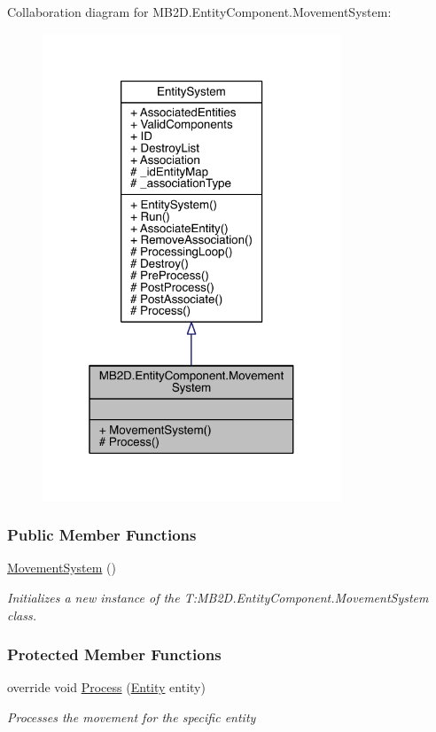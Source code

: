 Collaboration diagram for M\+B2\+D.\+Entity\+Component.\+Movement\+System\+:
\nopagebreak
\begin{figure}[H]
\begin{center}
\leavevmode
\includegraphics[width=253pt]{class_m_b2_d_1_1_entity_component_1_1_movement_system__coll__graph}
\end{center}
\end{figure}
\subsubsection*{Public Member Functions}
\begin{DoxyCompactItemize}
\item 
\hyperlink{class_m_b2_d_1_1_entity_component_1_1_movement_system_a64ad47c34d25ff6a9df2d2d841fc7cfb}{Movement\+System} ()
\begin{DoxyCompactList}\small\item\em Initializes a new instance of the T\+:\+M\+B2\+D.\+Entity\+Component.\+Movement\+System class. \end{DoxyCompactList}\end{DoxyCompactItemize}
\subsubsection*{Protected Member Functions}
\begin{DoxyCompactItemize}
\item 
override void \hyperlink{class_m_b2_d_1_1_entity_component_1_1_movement_system_afa730fd9080848ce877206c00a744cdf}{Process} (\hyperlink{class_m_b2_d_1_1_entity_component_1_1_entity}{Entity} entity)
\begin{DoxyCompactList}\small\item\em Processes the movement for the specific entity \end{DoxyCompactList}\end{DoxyCompactItemize}
